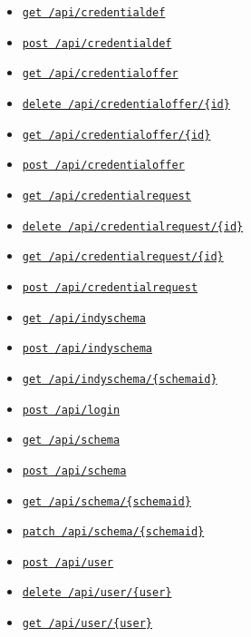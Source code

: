 \begin{itemize}
\item
  \protect\hyperlink{apiCredentialdefGet}{\texttt{get\ /api/credentialdef}}
\item
  \protect\hyperlink{apiCredentialdefPost}{\texttt{post\ /api/credentialdef}}
\item
  \protect\hyperlink{apiCredentialofferGet}{\texttt{get\ /api/credentialoffer}}
\item
  \protect\hyperlink{apiCredentialofferIdDelete}{\texttt{delete\ /api/credentialoffer/\{id\}}}
\item
  \protect\hyperlink{apiCredentialofferIdGet}{\texttt{get\ /api/credentialoffer/\{id\}}}
\item
  \protect\hyperlink{apiCredentialofferPost}{\texttt{post\ /api/credentialoffer}}
\item
  \protect\hyperlink{apiCredentialrequestGet}{\texttt{get\ /api/credentialrequest}}
\item
  \protect\hyperlink{apiCredentialrequestIdDelete}{\texttt{delete\ /api/credentialrequest/\{id\}}}
\item
  \protect\hyperlink{apiCredentialrequestIdGet}{\texttt{get\ /api/credentialrequest/\{id\}}}
\item
  \protect\hyperlink{apiCredentialrequestPost}{\texttt{post\ /api/credentialrequest}}
\item
  \protect\hyperlink{apiIndyschemaGet}{\texttt{get\ /api/indyschema}}
\item
  \protect\hyperlink{apiIndyschemaPost}{\texttt{post\ /api/indyschema}}
\item
  \protect\hyperlink{apiIndyschemaSchemaidGet}{\texttt{get\ /api/indyschema/\{schemaid\}}}
\item
  \protect\hyperlink{apiLoginPost}{\texttt{post\ /api/login}}
\item
  \protect\hyperlink{apiSchemaGet}{\texttt{get\ /api/schema}}
\item
  \protect\hyperlink{apiSchemaPost}{\texttt{post\ /api/schema}}
\item
  \protect\hyperlink{apiSchemaSchemaidGet}{\texttt{get\ /api/schema/\{schemaid\}}}
\item
  \protect\hyperlink{apiSchemaSchemaidPatch}{\texttt{patch\ /api/schema/\{schemaid\}}}
\item
  \protect\hyperlink{apiUserPost}{\texttt{post\ /api/user}}
\item
  \protect\hyperlink{apiUserUserDelete}{\texttt{delete\ /api/user/\{user\}}}
\item
  \protect\hyperlink{apiUserUserGet}{\texttt{get\ /api/user/\{user\}}}

\end{itemize}
